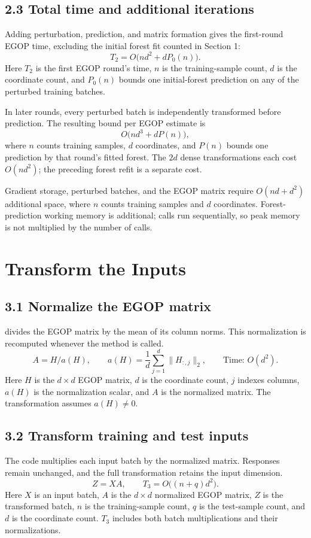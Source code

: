 \documentclass[11pt]{article}
\newcommand{\code}[1]{\texttt{\detokenize{#1}}}
\begin{document}
\subsection*{2.3 Total time and additional iterations}
Adding perturbation, prediction, and matrix formation gives the first-round
EGOP time, excluding the initial forest fit counted in Section 1:
\[
\boxed{T_2=O\bigl(nd^2+dP_0(n)\bigr).}
\]
Here $T_2$ is the first EGOP round's time, $n$ is the training-sample count,
$d$ is the coordinate count, and $P_0(n)$ bounds one initial-forest prediction
on any of the perturbed training batches.

In later rounds, every perturbed batch is independently transformed before
prediction. The resulting bound per EGOP estimate is
\[
O\bigl(nd^3+dP(n)\bigr),
\]
where $n$ counts training samples, $d$ coordinates, and $P(n)$ bounds one
prediction by that round's fitted forest. The $2d$ dense transformations each
cost $O(nd^2)$; the preceding forest refit is a separate cost.

Gradient storage, perturbed batches, and the EGOP matrix require
$O(nd+d^2)$ additional space, where $n$ counts training samples and $d$
coordinates. Forest-prediction working memory is additional; calls run
sequentially, so peak memory is not multiplied by the number of calls.

\section{Transform the Inputs}

\subsection*{3.1 Normalize the EGOP matrix}
\code{TrIM.transform} divides the EGOP matrix by the mean of its column norms.
This normalization is recomputed whenever the method is called.
\[
A=H/a(H),\qquad a(H)=\frac{1}{d}\sum_{j=1}^{d}\lVert H_{:,j}\rVert_2,
\qquad \text{Time: }O(d^2).
\]
Here $H$ is the $d\times d$ EGOP matrix, $d$ is the coordinate count, $j$
indexes columns, $a(H)$ is the normalization scalar, and $A$ is the normalized
matrix. The transformation assumes $a(H)\ne0$.

\subsection*{3.2 Transform training and test inputs}
The code multiplies each input batch by the normalized matrix. Responses
remain unchanged, and the full transformation retains the input dimension.
\[
Z=XA,\qquad \boxed{T_3=O\bigl((n+q)d^2\bigr).}
\]
Here $X$ is an input batch, $A$ is the $d\times d$ normalized EGOP matrix,
$Z$ is the transformed batch, $n$ is the training-sample count, $q$ is the
test-sample count, and $d$ is the coordinate count. $T_3$ includes both batch
multiplications and their normalizations.
\end{document}
